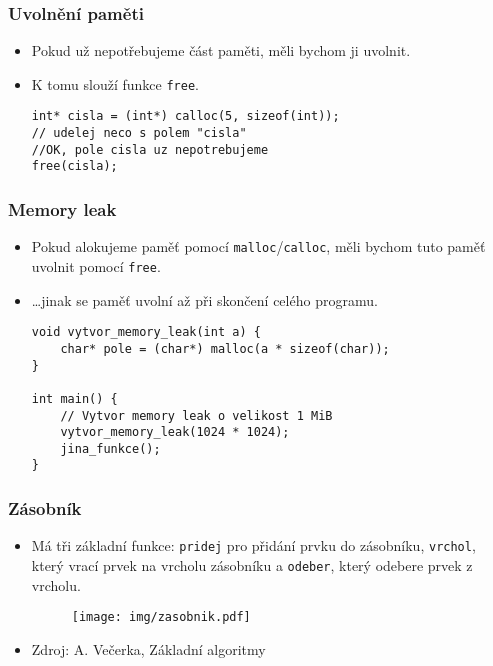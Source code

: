 \documentclass{beamer}
\newenvironment{itemizex}%
  {\large \begin{itemize}%
    \setlength{\itemsep}{8pt}%
    \setlength{\parskip}{8pt}}%
  {\end{itemize}}
\begin{document}
\begin{frame}[t,fragile]\frametitle{Uvolnění paměti} 
    \begin{itemizex}
        \item Pokud už nepotřebujeme část paměti, měli bychom ji uvolnit.
        \item K tomu slouží funkce \texttt{free}.
        \begin{verbatim} 
int* cisla = (int*) calloc(5, sizeof(int));
// udelej neco s polem "cisla"
//OK, pole cisla uz nepotrebujeme
free(cisla);
        \end{verbatim}
    \end{itemizex}
\end{frame}


\begin{frame}[t,fragile]\frametitle{Memory leak} 
    \begin{itemizex}
        \item Pokud alokujeme paměť pomocí \texttt{malloc}/\texttt{calloc}, měli bychom tuto paměť uvolnit pomocí \texttt{free}.
        \item \dots jinak se paměť uvolní až při skončení celého programu.
        \begin{verbatim} 
void vytvor_memory_leak(int a) {
    char* pole = (char*) malloc(a * sizeof(char));
}

int main() {
    // Vytvor memory leak o velikost 1 MiB
    vytvor_memory_leak(1024 * 1024);
    jina_funkce();
}
        \end{verbatim}
    \end{itemizex}
\end{frame}


\begin{frame}[t,fragile]\frametitle{Zásobník} 
    \begin{itemizex}
        \item Má tři základní funkce: \texttt{pridej} pro přidání prvku do zásobníku, \texttt{vrchol}, který vrací prvek na vrcholu zásobníku a \texttt{odeber}, který odebere prvek z vrcholu.
        \begin{figure}[htb]
            \centering
            \texttt{[image: img/zasobnik.pdf]}
        \end{figure}
        \item {\tiny Zdroj: A. Večerka, Základní algoritmy}
    \end{itemizex}
\end{frame}
\end{document}
